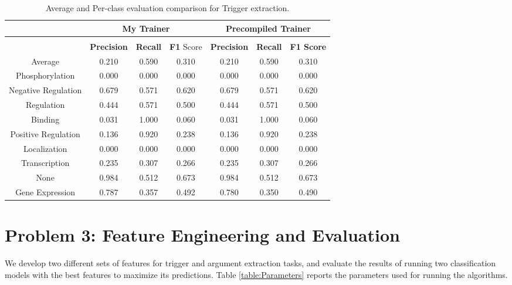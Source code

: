 \documentclass{article} %
\begin{document}
\begin{table}[!htbp]
\caption{Average and Per-class evaluation comparison for Trigger extraction.}
\label{table:AveragePerceptron}
\begin{center}
\begin{tabular}{c c c c c c c}
\multicolumn{1}{c}{} & \multicolumn{3}{c}{\bf My Trainer}  &\multicolumn{3}{c}{\bf Precompiled Trainer}
\\ \hline \\
{} & \textbf{Precision} & \textbf{Recall} & \textbf{F1} Score & \textbf{Precision} & \textbf{Recall} & \textbf{F1 Score}\\
Average             & 0.210 & 0.590 & 0.310 & 0.210 & 0.590 & 0.310\\
Phosphorylation     & 0.000   & 0.000   & 0.000   & 0.000   & 0.000   & 0.000\\
Negative Regulation & 0.679 & 0.571 & 0.620 & 0.679 & 0.571 & 0.620\\
Regulation          & 0.444 & 0.571 & 0.500   & 0.444 & 0.571 & 0.500\\
Binding             & 0.031 & 1.000   & 0.060 & 0.031 & 1.000   & 0.060\\
Positive Regulation & 0.136 & 0.920  & 0.238 & 0.136 & 0.920  & 0.238\\
Localization        & 0.000   & 0.000   & 0.000   & 0.000   & 0.000   & 0.000\\
Transcription       & 0.235 & 0.307 & 0.266 & 0.235 & 0.307 & 0.266\\
None                & 0.984 & 0.512 & 0.673 & 0.984 & 0.512 & 0.673\\
Gene Expression     & 0.787 & 0.357 & 0.492 & 0.780  & 0.350  & 0.490\\
\end{tabular}
\end{center}
\end{table}

\section*{Problem 3: Feature Engineering and Evaluation \cite{mcclosky2011event}\cite{miwa2010event}\cite{riedel2011model}} 

We develop two different sets of features for trigger and argument extraction tasks, and evaluate the results of running two classification models with the best features to maximize its predictions. Table \ref{table:Parameters} reports the parameters used for running the algorithms.
\end{document}
